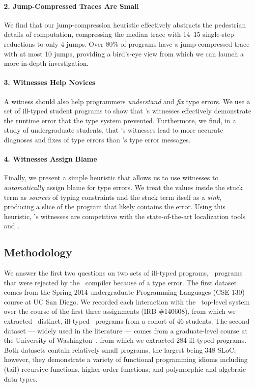 \paragraph{2. Jump-Compressed Traces Are Small}
We find that our jump-compression heuristic effectively abstracts the
pedestrian details of computation, compressing the median trace with
14--15 single-step reductions to only 4 jumps.
%
Over 80\% of programs have a jump-compressed trace with at most 10
jumps, providing a bird's-eye view from which we can launch a more
in-depth investigation.

\paragraph{3. Witnesses Help Novices}
A witness should also help programmers \emph{understand} and
\emph{fix} type errors.
%
We use a set of ill-typed student programs to show that \toolname's
witnesses effectively demonstrate the runtime error that the type
system prevented.
%
Furthermore, we find, in a study of undergraduate students, that
\toolname's witnesses lead to more accurate diagnoses and fixes of type
errors than \ocaml's type error messages.

\paragraph{4. Witnesses Assign Blame}
Finally, we present a simple heuristic that allows us to use witnesses
to \emph{automatically} assign blame for type errors.
%
We treat the values inside the stuck term as \emph{sources} of typing
constraints and the stuck term itself as a \emph{sink}, producing
a slice of the program that likely contains the error.
%
Using this heuristic, \toolname's witnesses are competitive with the
state-of-the-art localization tools \mycroft and \sherrloc.

\subsection{Methodology}
\label{sec:nanomaly:methodology}
We answer the first two questions on two sets of ill-typed programs,
\ie\ programs that were rejected by the \ocaml\ compiler because of a
type error.
%
The first dataset comes from the Spring 2014 undergraduate Programming
Languages (CSE 130) course at UC San Diego.
%
We recorded each interaction with the \ocaml\ top-level system over the
course of the first three assignments (IRB
\#140608),
from which we extracted \ucsdsize\ distinct, ill-typed \ocaml\ programs
from a cohort of 46 students.
%
The second dataset --- widely used in the literature --- comes from a
graduate-level course at the University of Washington~\cite{Lerner2006-pj},
from which we extracted 284 ill-typed programs.
%
Both datasets contain relatively small programs, the largest being 348
SLoC; however, they demonstrate a variety of functional programming
idioms including (tail) recursive functions, higher-order functions,
and polymorphic and algebraic data types. %

